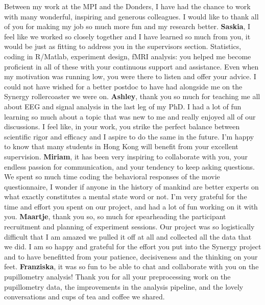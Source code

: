 Between my work at the MPI and the Donders, I have had the chance to work with many wonderful, inspiring and generous colleagues. I would like to thank all of you for making my job so much more fun and my research better. \newline
\textbf{Saskia}, I feel like we worked so closely together and I have learned so much from you, it would be just as fitting to address you in the supervisors section. Statistics, coding in R/Matlab, experiment design, fMRI analysis: you helped me become proficient in all of these with your continuous support and assistance. Even when my motivation was running low, you were there to listen and offer your advice. I could not have wished for a better postdoc to have had alongside me on the Synergy rollercoaster we were on. \newline
\textbf{Ashley}, thank you so much for teaching me all about EEG and signal analysis in the last leg of my PhD. I had a lot of fun learning so much about a topic that was new to me and really enjoyed all of our discussions. I feel like, in your work, you strike the perfect balance between scientific rigor and efficacy and I aspire to do the same in the future. I'm happy to know that many students in Hong Kong will benefit from your excellent supervision. \newline
\textbf{Miriam}, it has been very inspiring to collaborate with you, your endless passion for communication, and your tendency to keep asking questions. We spent so much time coding the behavioral responses of the movie questionnaire, I wonder if anyone in the history of mankind are better experts on what exactly constitutes a mental state word or not. I'm very grateful for the time and effort you spent on our project, and had a lot of fun working on it with you. \newline
\textbf{Maartje}, thank you so, so much for spearheading the participant recruitment and planning of experiment sessions. Our project was so logistically difficult that I am amazed we pulled it off at all and collected all the data that we did. I am so happy and grateful for the effort you put into the Synergy project and to have benefitted from your patience, decisiveness and the thinking on your feet. \newline
\textbf{Franziska}, it was so fun to be able to chat and collaborate with you on the pupillometry analysis! Thank you for all your preprocessing work on the pupillometry data, the improvements in the analysis pipeline, and the lovely conversations and cups of tea and coffee we shared. \newline
